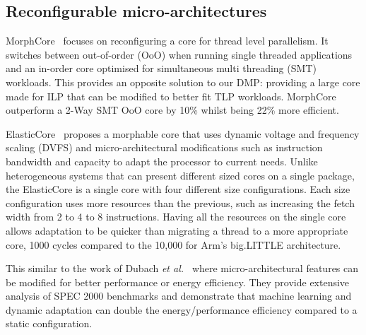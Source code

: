 \vspace{-1em}
\subsection{Reconfigurable micro-architectures}

MorphCore~\cite{khubaibMorphCore2012} focuses on reconfiguring a core for thread level parallelism.
It switches between out-of-order (OoO) when running single threaded applications and an in-order core optimised for simultaneous multi threading (SMT) workloads.
This provides an opposite solution to our DMP: providing a large core made for ILP that can be modified to better fit TLP workloads.
MorphCore outperform a 2-Way SMT OoO core by 10\% whilst being 22\% more efficient.

ElasticCore~\cite{tavanaElastic} proposes a morphable core that uses dynamic voltage and frequency scaling (DVFS) and micro-architectural modifications such as instruction bandwidth and capacity to adapt the processor to current needs.
Unlike heterogeneous systems that can present different sized cores on a single package, the ElasticCore is a single core with four different size configurations.
Each size configuration uses more resources than the previous, such as increasing the fetch width from 2 to 4 to 8 instructions.
Having all the resources on the single core allows adaptation to be quicker than migrating a thread to a  more appropriate core, 1000 cycles compared to the 10,000 for Arm's big.LITTLE architecture.

This similar to the work of Dubach {\it et al.~}\cite{dubach13dynamic} where micro-architectural features can be modified for better performance or energy efficiency.
They provide extensive analysis of SPEC 2000 benchmarks and demonstrate that machine learning and dynamic adaptation can double the energy/performance efficiency compared to a static configuration.


